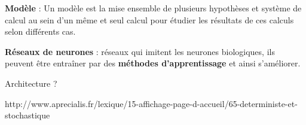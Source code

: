 \documentclass[12pt]{article}
\begin{document}
\textbf{Modèle} : Un modèle est la mise ensemble de plusieurs hypothèses et système de calcul au sein d’un même et seul calcul pour étudier les résultats de ces calculs selon différents cas.

\textbf{Réseaux de neurones} : réseaux qui imitent les neurones biologiques, ils peuvent être entraîner par des \textbf{méthodes d'apprentissage} et ainsi s'améliorer.

Architecture ?


http://www.aprecialis.fr/lexique/15-affichage-page-d-accueil/65-deterministe-et-stochastique
\end{document}
